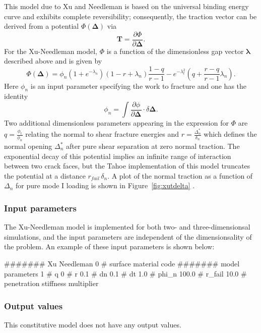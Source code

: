 This model due to Xu and Needleman \cite{Needleman1994} is based 
on the universal binding energy
curve and exhibits complete reversibility; consequently, the traction vector
can be derived from a potential $\Phi(\boldsymbol{\Delta})$ via
\begin{equation}
\mathbf{T} = \frac{\partial \Phi}{\partial \boldsymbol{\Delta}}.
\end{equation}
For the Xu-Needleman model, $\Phi$ is a function of the dimensionless
gap vector $\boldsymbol{\lambda}$ described above and is given by 
\begin{equation}
\Phi(\boldsymbol{\Delta}) = \phi_n (1+e^{-\lambda_n}) (1-r+\lambda_n)\frac{1-q}{r-1}-e^{-\lambda_t^2} ( q+\frac{r-q}{r-1}\lambda_n ).
\end{equation}
Here $\phi_n$ is an input parameter specifying the work to fracture and one has
the identity
\begin{equation}
\phi_n = \int \frac{\partial \phi}{\partial \boldsymbol{\Delta}}\cdot \delta 
\boldsymbol{\Delta}.
\end{equation}
Two additional dimensionless parameters appearing in the expression for
$\Phi$ are $q = \frac{\phi_t}{\phi_n}$
relating the normal to shear fracture energies and $r = \frac{\Delta_n^*}{\delta_n}$
which defines the normal opening $\Delta_n^*$ after pure shear separation at zero
normal traction. The exponential decay of this potential implies an infinite range
of interaction between two crack faces, but the Tahoe implementation of this
model truncates the potential at a distance $r_{fail}\,\delta_n$. A plot
of the normal traction as a function of $\Delta_n$ for pure mode I loading
is shown in Figure~\ref{fig:xutdelta} . 

\subsubsection{Input parameters}

The Xu-Needleman model is implemented for both two- and three-dimensionsal
simulations, and the input parameters are independent of the dimensionsality
of the problem.  An example of these input parameters is shown below:
\begin{inputfile}
####### Xu Needleman
0     # surface material code
####### model parameters
1     # q
0     # r
0.1   # dn
0.1   # dt
1.0   # phi_n
100.0 # r_fail
10.0  # penetration stiffness multiplier 
\end{inputfile}

\subsubsection{Output values}
This constitutive model does not have any output values.

